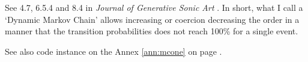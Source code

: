 \bigskip
\bigskip


\bigskip

See  4.7, 6.5.4 and 8.4 in \textsl{Journal of Generative Sonic Art} \citep{yi}. In short, what I call a `Dynamic Markov Chain' allows increasing or coercion decreasing the order in a manner that the transition probabilities does not reach 100\% for a single event.
 
See also code instance on the Annex \ref{ann:mcone} on page \pageref{ann:mcone}.


